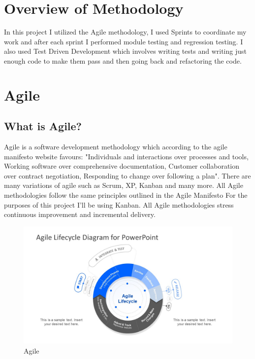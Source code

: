 \section{Overview of Methodology}
In this project I utilized the Agile methodology, I used Sprints to coordinate my work and after each sprint I performed
module testing and regression testing.  I also used Test Driven Development which involves writing tests and writing just
enough code to make them pass and then going back and refactoring the code.
\section{Agile}
\subsection{What is Agile?}
Agile is a software development methodology which according to the agile manifesto website \cite{Agile} favours: "Individuals and interactions over processes and tools,
Working software over comprehensive documentation,
Customer collaboration over contract negotiation,
Responding to change over following a plan".  There are many variations of agile \cite{VariationsofAgile} such as Scrum, XP, Kanban and many more. All Agile methodologies follow the same principles outlined in the Agile Manifesto\cite{Agile} For the purposes of this project I'll be using Kanban.  All Agile methodologies stress
continuous improvement and incremental delivery.
\begin{figure}[h!]
  \includegraphics[width=\textwidth]{img/agile.jpg}
  \caption{Agile}
  \label{fig: Image of Agile Lifecycle}
\end{figure}
\\
\cite{AgileImage}
